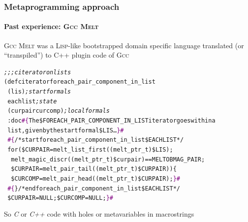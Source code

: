 \documentclass[xcolor=svgnames,final,smaller,a4]{beamer}
\begin{document}
\begin{frame}
    \frametitle{Metaprogramming approach}
    \framesubtitle{Past experience: \textsc{Gcc Melt}}

\textsc{Gcc Melt} was a \textsc{Lisp}-like bootstrapped domain
specific language translated (or ``transpiled'') to C++ plugin
code of \textsc{Gcc}

\begin{relsize}{-1.5}
\begin{alltt}
  \textit{;;; citerator on lists}\\
(defciterator foreach\_pair\_component\_in\_list\\
~  (lis)                                 \textit{;start formals}\\
~  eachlist                              \textit{;state}\\
~  (curpair curcomp)                     \textit{;local formals}\\
~ :doc \textcolor{purple}{\#\{}The \$FOREACH\_PAIR\_COMPONENT\_IN\_LIST iterator goes within a\\
~  list, given by the start formal \$LIS \ldots \textcolor{purple}{\}\#}\\
~  \textcolor{purple}{\#\{}/* start foreach\_pair\_component\_in\_list \$EACHLIST */\\
~  for (\$CURPAIR = melt\_list\_first( (melt\_ptr\_t)\$LIS);\\
~ ~       melt\_magic\_discr((melt\_ptr\_t) \$curpair) == MELTOBMAG\_PAIR;\\
~ ~       \$CURPAIR = melt\_pair\_tail((melt\_ptr\_t) \$CURPAIR)) \{\\
~ ~       \$CURCOMP = melt\_pair\_head((melt\_ptr\_t) \$CURPAIR); \textcolor{purple}{\}\#}\\
~  \textcolor{purple}{\#\{} \} /* end foreach\_pair\_component\_in\_list \$EACHLIST */\\
~    \$CURPAIR = NULL; \$CURCOMP = NULL; \textcolor{purple}{\}\#}
\end{alltt}
\end{relsize}

So \textit{C} or \textit{C++} code with holes or metavariables in macrostrings
\end{frame}
\end{document}
